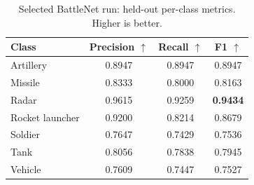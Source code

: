 \documentclass[conference]{IEEEtran}
\newcommand{\best}[1]{\textbf{#1}}
\begin{document}
\begin{table}[t]
\caption{Selected BattleNet run: held-out per-class metrics. Higher is better.}
\label{tab:class-results}
\centering
\footnotesize
\begin{tabular}{lccc}
\toprule
Class & Precision $\uparrow$ & Recall $\uparrow$ & F1 $\uparrow$\\
\midrule
Artillery & 0.8947 & 0.8947 & 0.8947\\
Missile & 0.8333 & 0.8000 & 0.8163\\
Radar & 0.9615 & 0.9259 & \best{0.9434}\\
Rocket launcher & 0.9200 & 0.8214 & 0.8679\\
Soldier & 0.7647 & 0.7429 & 0.7536\\
Tank & 0.8056 & 0.7838 & 0.7945\\
Vehicle & 0.7609 & 0.7447 & 0.7527\\
\bottomrule
\end{tabular}
\end{table}
\end{document}
